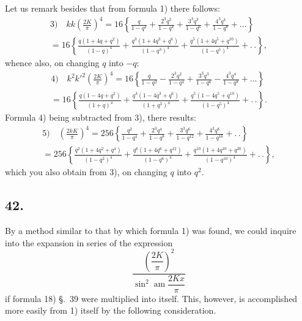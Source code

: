 \documentclass{article}
\begin{document}
Let us remark besides that from formula 1) there follows:
\[
\begin{gathered}
\text{3)}\quad kk\left(\frac{2K}{\pi}\right)^{4}=16\left\{\frac{q}{1-q^{2}}+\frac{2^{3}q^{2}}{1-q^{4}}+\frac{3^{3}q^{3}}{1-q^{6}}+\frac{4^{3}q^{4}}{1-q^{8}}+\ldots\right\}\\[1.5ex]
=16\left\{\frac{q(1+4q+q^{2})}{(1-q)^{4}}+\frac{q^{3}(1+4q^{3}+q^{6})}{(1-q^{3})^{4}}+\frac{q^{5}(1+4q^{5}+q^{10})}{(1-q^{5})^{4}}+.\,.\right\},
\end{gathered}
\]
whence also, on changing $q$ into $-q$:
\[
\begin{gathered}
\text{4)}\quad k^{2}k'^{2}\left(\frac{2K}{\pi}\right)^{4}=16\left\{\frac{q}{1-q^{2}}-\frac{2^{3}q^{2}}{1-q^{4}}+\frac{3^{3}q^{3}}{1-q^{6}}-\frac{4^{3}q^{4}}{1-q^{8}}+\ldots\right\}\\[1.5ex]
=16\left\{\frac{q(1-4q+q^{2})}{(1+q)^{4}}+\frac{q^{3}(1-4q^{3}+q^{6})}{(1+q^{3})^{4}}+\frac{q^{5}(1-4q^{5}+q^{10})}{(1-q^{5})^{4}}+.\,.\right\}.
\end{gathered}
\]
Formula 4) being subtracted from 3), there results:
\[
\begin{gathered}
\text{5)}\quad\left(\frac{2kK}{\pi}\right)^{4}=256\left\{\frac{q^{2}}{1-q^{4}}+\frac{2^{3}q^{4}}{1-q^{8}}+\frac{3^{3}q^{6}}{1-q^{12}}+\frac{4^{3}q^{8}}{1-q^{16}}+.\,.\right\}\\[1.5ex]
=256\left\{\frac{q^{2}(1+4q^{2}+q^{4})}{(1-q^{2})^{4}}+\frac{q^{6}(1+4q^{6}+q^{12})}{(1-q^{6})^{4}}+\frac{q^{10}(1+4q^{10}+q^{20})}{(1-q^{10})^{4}}+.\,.\right\},
\end{gathered}
\]
which you also obtain from 3), on changing $q$ into $q^{2}$.

\subsection*{42.}

By a method similar to that by which formula 1) was found, we could inquire into the expansion in series of the expression
\[
\frac{\left(\dfrac{2K}{\pi}\right)^{2}}{\sin^{2}\operatorname{am}\dfrac{2Kx}{\pi}}
\]
if formula 18) §.\ 39 were multiplied into itself. This, however, is accomplished more easily from 1) itself by the following consideration.
\end{document}
